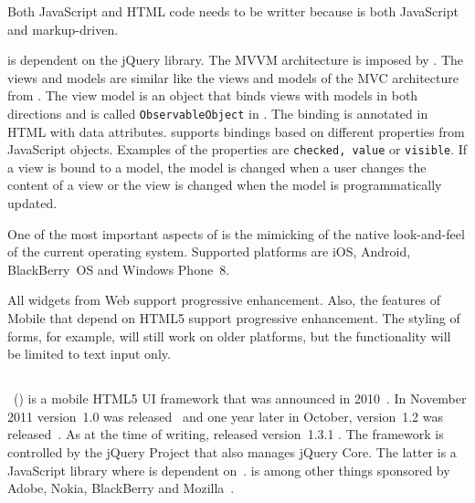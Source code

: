 \documentclass[a4paper]{artikel3}
\newcommand{\code}[1]{\texttt{#1}}
\newcommand{\setspace}[0]{\vspace{2mm}}
\renewcommand{\paragraph}[1]{\setspace \noindent {\bf #1}  }
\begin{document}
\paragraph{Code and development}
Both JavaScript and HTML code needs to be writter because \kendo{} is both JavaScript and markup-driven.

\kendo{} is dependent on the jQuery library.
The MVVM architecture is imposed by \kendoa{}.
The views and models are similar like the views and models of the MVC architecture from \sta{}.
The view model is an object that binds views with models in both directions and is called \code{ObservableObject} in \kendoa{}.
The binding is annotated in HTML with data attributes.
\kendoa{} supports bindings based on different properties from JavaScript objects.
Examples of the properties are \code{checked,  value} or \code{visible}.
If a view is bound to a model,  the model is changed when a user changes the content of a view or the view is changed when the model is programmatically updated.

\paragraph{Browser support}
One of the most important aspects of \kendoa{} is the mimicking of the native look-and-feel of the current operating system.
Supported platforms are iOS,  Android,  BlackBerry~OS and Windows Phone~8.

All widgets from \kendo{} Web support progressive enhancement.
Also,  the features of \kendo{} Mobile that depend on HTML5 support progressive enhancement.
The styling of forms,  for example,  will still work on older platforms, but the functionality will be limited to text input only.



\subsection{\jqm{}} %
\label{sec:jqm}

\jqm{}~(\jqma{}) is a mobile HTML5 UI framework that was announced in 2010~\cite{Resig2010}. 
In November 2011 version~1.0 was released~\cite{Parker2011} and one year later in October, version~1.2 was released~\cite{Parker2012}. 
As at the time of writing, \jqma{} released version~1.3.1 \cite{Parker2013a}. %
The framework is controlled by the jQuery Project that also manages jQuery Core. 
The latter is a JavaScript library where \jqma{} is dependent on~\cite{JQuery2012}. 
\jqma{} is among other things sponsored by Adobe, Nokia, BlackBerry and Mozilla~\cite{JQuery2012a}.
\end{document}
